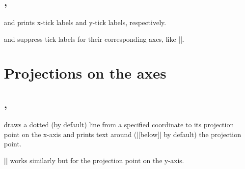 \subsection{\protect\cmd{\tzticksx(*)}, \protect\cmd{\tzticksy(*)}}
\label{ssi:tztikcsx}

\icmd{\tzticksx} and \icmd{\tzticksy} prints x-tick labels and y-tick labels, respectively.

\begin{tzcode}{.3}
\end{tzcode}

\icmd{\tzticksx*} and \icmd{\tzticksy*} suppress tick labels for their corresponding axes, like |\tzticks*|.

\begin{tzcode}{.3}
\end{tzcode}


\section{Projections on the axes}
\label{si:projections}


\subsection{\protect\cmd{\tzprojx(*)}, \protect\cmd{\tzprojy(*)}}
\label{ssi:tzprojx}

\icmd{\tzprojx} draws a dotted (by default) line from a specified coordinate to its projection point on the x-axis and prints text around (|[below]| by default) the projection point.

|\tzprojy| works similarly but for the projection point on the y-axis.

\begin{tzcode}{.3}
\end{tzcode}

